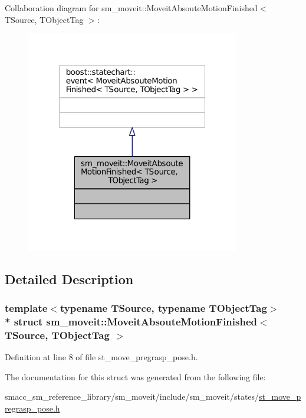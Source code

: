 Collaboration diagram for sm\+\_\+moveit\+:\+:Moveit\+Absoute\+Motion\+Finished$<$ T\+Source, T\+Object\+Tag $>$\+:
\nopagebreak
\begin{figure}[H]
\begin{center}
\leavevmode
\includegraphics[width=265pt]{structsm__moveit_1_1MoveitAbsouteMotionFinished__coll__graph}
\end{center}
\end{figure}


\subsection{Detailed Description}
\subsubsection*{template$<$typename T\+Source, typename T\+Object\+Tag$>$\\*
struct sm\+\_\+moveit\+::\+Moveit\+Absoute\+Motion\+Finished$<$ T\+Source, T\+Object\+Tag $>$}



Definition at line 8 of file st\+\_\+move\+\_\+pregrasp\+\_\+pose.\+h.



The documentation for this struct was generated from the following file\+:\begin{DoxyCompactItemize}
\item 
smacc\+\_\+sm\+\_\+reference\+\_\+library/sm\+\_\+moveit/include/sm\+\_\+moveit/states/\hyperlink{st__move__pregrasp__pose_8h}{st\+\_\+move\+\_\+pregrasp\+\_\+pose.\+h}\end{DoxyCompactItemize}
